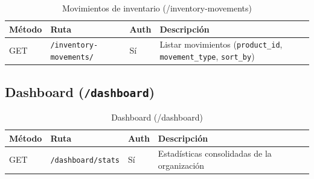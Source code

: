 \begin{longtable}[]{@{}
  >{\raggedright\arraybackslash}p{}
  >{\raggedright\arraybackslash}p{}
  >{\raggedright\arraybackslash}p{}
  >{\raggedright\arraybackslash}p{}@{}}
\caption[Movimientos de inventario (/inventory-movements)]{Movimientos de inventario (/inventory-movements)}\tabularnewline
\toprule\noalign{}
\begin{minipage}[b]{\linewidth}\raggedright
Método
\end{minipage} & \begin{minipage}[b]{\linewidth}\raggedright
Ruta
\end{minipage} & \begin{minipage}[b]{\linewidth}\raggedright
Auth
\end{minipage} & \begin{minipage}[b]{\linewidth}\raggedright
Descripción
\end{minipage} \\
\midrule\noalign{}
\endhead
\bottomrule\noalign{}
\endlastfoot
GET & \texttt{/inventory-movements/} & Sí & Listar movimientos (\texttt{product\_id}, \texttt{movement\_type}, \texttt{sort\_by}) \\
\end{longtable}

\subsection{\texorpdfstring{Dashboard (\texttt{/dashboard})}{Dashboard (/dashboard)}}\label{dashboard-dashboard}

\begin{longtable}[]{@{}
  >{\raggedright\arraybackslash}p{}
  >{\raggedright\arraybackslash}p{}
  >{\raggedright\arraybackslash}p{}
  >{\raggedright\arraybackslash}p{}@{}}
\caption[Dashboard (/dashboard)]{Dashboard (/dashboard)}\tabularnewline
\toprule\noalign{}
\begin{minipage}[b]{\linewidth}\raggedright
Método
\end{minipage} & \begin{minipage}[b]{\linewidth}\raggedright
Ruta
\end{minipage} & \begin{minipage}[b]{\linewidth}\raggedright
Auth
\end{minipage} & \begin{minipage}[b]{\linewidth}\raggedright
Descripción
\end{minipage} \\
\midrule\noalign{}
\endhead
\bottomrule\noalign{}
\endlastfoot
GET & \texttt{/dashboard/stats} & Sí & Estadísticas consolidadas de la organización \\
\end{longtable}

